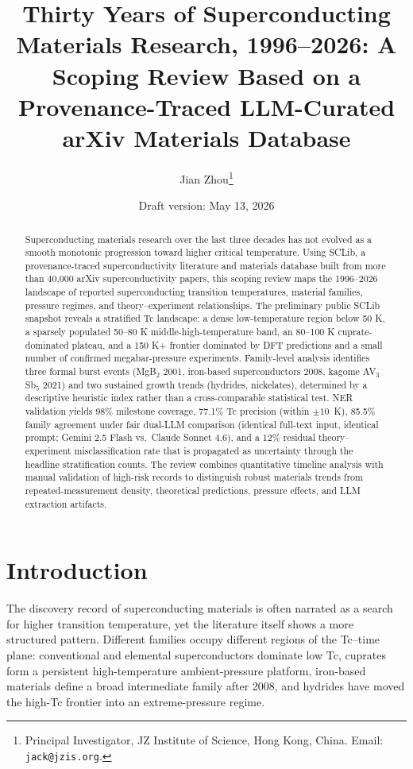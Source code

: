 \documentclass[11pt]{article}
\title{Thirty Years of Superconducting Materials Research, 1996--2026: A Scoping Review Based on a Provenance-Traced LLM-Curated arXiv Materials Database}
\author{Jian Zhou\thanks{Principal Investigator, JZ Institute of Science, Hong Kong, China.
Email: \texttt{jack@jzis.org}.}}
\date{Draft version: May 13, 2026}
\begin{document}
\maketitle

\begin{abstract}
Superconducting materials research over the last three decades has not evolved as a smooth monotonic progression toward higher critical temperature. Using SCLib, a provenance-traced superconductivity literature and materials database built from more than 40,000 arXiv superconductivity papers, this scoping review maps the 1996--2026 landscape of reported superconducting transition temperatures, material families, pressure regimes, and theory--experiment relationships. The preliminary public SCLib snapshot reveals a stratified Tc landscape: a dense low-temperature region below 50 K, a sparsely populated 50--80 K middle-high-temperature band, an 80--100 K cuprate-dominated plateau, and a 150 K+ frontier dominated by DFT predictions and a small number of confirmed megabar-pressure experiments. Family-level analysis identifies three formal burst events (MgB$_2$ 2001, iron-based superconductors 2008, kagome AV$_3$Sb$_5$ 2021) and two sustained growth trends (hydrides, nickelates), determined by a descriptive heuristic index rather than a cross-comparable statistical test. NER validation yields 98\% milestone coverage, 77.1\% Tc precision (within $\pm 10$~K), 85.5\% family agreement under fair dual-LLM comparison (identical full-text input, identical prompt; Gemini 2.5 Flash vs.\ Claude Sonnet 4.6), and a 12\% residual theory--experiment misclassification rate that is propagated as uncertainty through the headline stratification counts. The review combines quantitative timeline analysis with manual validation of high-risk records to distinguish robust materials trends from repeated-measurement density, theoretical predictions, pressure effects, and LLM extraction artifacts.
\end{abstract}

\section{Introduction}

The discovery record of superconducting materials is often narrated as a search for higher transition temperature, yet the literature itself shows a more structured pattern. Different families occupy different regions of the Tc--time plane: conventional and elemental superconductors dominate low Tc, cuprates form a persistent high-temperature ambient-pressure platform, iron-based materials define a broad intermediate family after 2008, and hydrides have moved the high-Tc frontier into an extreme-pressure regime.
\end{document}
